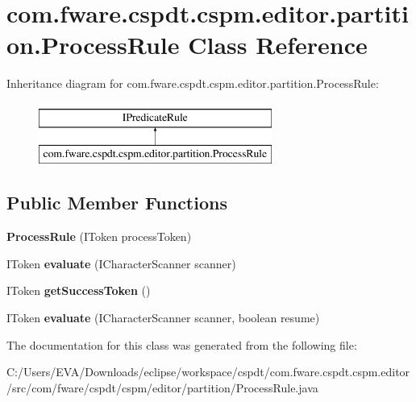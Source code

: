 \hypertarget{classcom_1_1fware_1_1cspdt_1_1cspm_1_1editor_1_1partition_1_1_process_rule}{}\section{com.\+fware.\+cspdt.\+cspm.\+editor.\+partition.\+Process\+Rule Class Reference}
\label{classcom_1_1fware_1_1cspdt_1_1cspm_1_1editor_1_1partition_1_1_process_rule}
Inheritance diagram for com.\+fware.\+cspdt.\+cspm.\+editor.\+partition.\+Process\+Rule\+:\begin{figure}[H]
\begin{center}
\leavevmode
\includegraphics[height=2.000000cm]{classcom_1_1fware_1_1cspdt_1_1cspm_1_1editor_1_1partition_1_1_process_rule}
\end{center}
\end{figure}
\subsection*{Public Member Functions}
\begin{DoxyCompactItemize}
\item 
\mbox{\label{classcom_1_1fware_1_1cspdt_1_1cspm_1_1editor_1_1partition_1_1_process_rule_a2821571086365f56f950f27d7a4b610d}} 
{\bfseries Process\+Rule} (I\+Token process\+Token)
\item 
\mbox{\label{classcom_1_1fware_1_1cspdt_1_1cspm_1_1editor_1_1partition_1_1_process_rule_a2a6f03e0864e834bed4c8f69df0e7381}} 
I\+Token {\bfseries evaluate} (I\+Character\+Scanner scanner)
\item 
\mbox{\label{classcom_1_1fware_1_1cspdt_1_1cspm_1_1editor_1_1partition_1_1_process_rule_a27b705bd337d8a3261ae7e92a59e5e89}} 
I\+Token {\bfseries get\+Success\+Token} ()
\item 
\mbox{\label{classcom_1_1fware_1_1cspdt_1_1cspm_1_1editor_1_1partition_1_1_process_rule_a8124341b2f7ea0a281fbcb3cad2cf434}} 
I\+Token {\bfseries evaluate} (I\+Character\+Scanner scanner, boolean resume)
\end{DoxyCompactItemize}


The documentation for this class was generated from the following file\+:\begin{DoxyCompactItemize}
\item 
C\+:/\+Users/\+E\+V\+A/\+Downloads/eclipse/workspace/cspdt/com.\+fware.\+cspdt.\+cspm.\+editor/src/com/fware/cspdt/cspm/editor/partition/Process\+Rule.\+java\end{DoxyCompactItemize}

